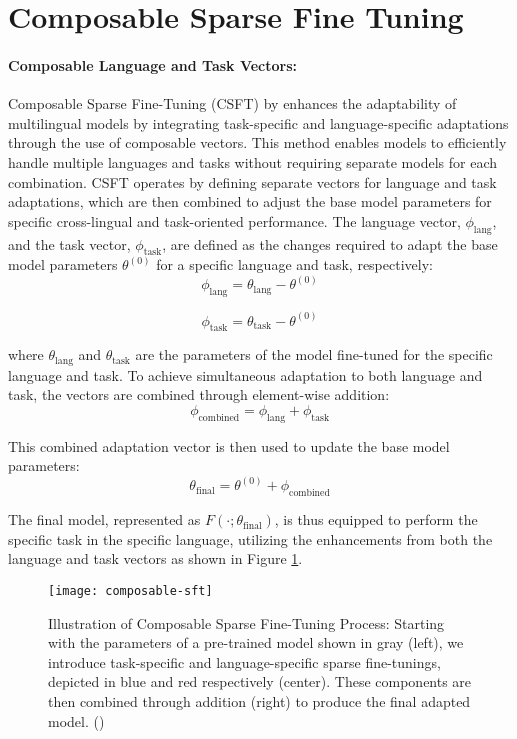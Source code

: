 \section{Composable Sparse Fine Tuning}
\paragraph{Composable Language and Task Vectors:} Composable Sparse Fine-Tuning (CSFT) by \citet{ansell2023composable} enhances the adaptability of multilingual models by integrating task-specific and language-specific adaptations through the use of composable vectors. This method enables models to efficiently handle multiple languages and tasks without requiring separate models for each combination. CSFT operates by defining separate vectors for language and task adaptations, which are then combined to adjust the base model parameters for specific cross-lingual and task-oriented performance. The language vector, \(\phi_{\text{lang}}\), and the task vector, \(\phi_{\text{task}}\), are defined as the changes required to adapt the base model parameters \(\theta^{(0)}\) for a specific language and task, respectively:
\begin{equation}
	\phi_{\text{lang}} = \theta_{\text{lang}} - \theta^{(0)}
\end{equation}

\begin{equation}
	\phi_{\text{task}} = \theta_{\text{task}} - \theta^{(0)}
\end{equation}

where \(\theta_{\text{lang}}\) and \(\theta_{\text{task}}\) are the parameters of the model fine-tuned for the specific language and task. To achieve simultaneous adaptation to both language and task, the vectors are combined through element-wise addition:
\begin{equation}
	\phi_{\text{combined}} = \phi_{\text{lang}} + \phi_{\text{task}}
\end{equation}

This combined adaptation vector is then used to update the base model parameters:
\begin{equation}
	\theta_{\text{final}} = \theta^{(0)} + \phi_{\text{combined}}
\end{equation}

The final model, represented as \( F(\cdot; \theta_{\text{final}}) \), is thus equipped to perform the specific task in the specific language, utilizing the enhancements from both the language and task vectors as shown in Figure \ref{fig: composable-sft}.
\begin{figure}[tbh]
	\centering
	\texttt{[image: composable-sft]}
	\caption[Illustration of Composable Sparse Fine-Tuning Process]{Illustration of Composable Sparse Fine-Tuning Process: Starting with the parameters of a pre-trained model shown in gray (left), we introduce task-specific and language-specific sparse fine-tunings, depicted in blue and red respectively (center). These components are then combined through addition (right) to produce the final adapted model. (\citet{ansell2023composable})}
	\label{fig: composable-sft}
\end{figure}

